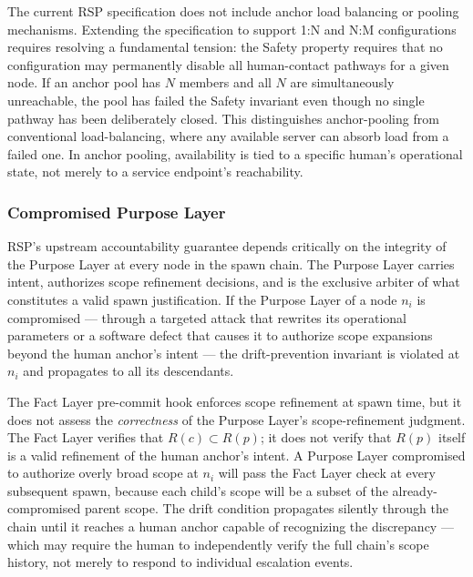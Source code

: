 The current RSP specification does not include anchor load balancing or pooling mechanisms. Extending the specification to support 1:N and N:M configurations requires resolving a fundamental tension: the Safety property requires that no configuration may permanently disable all human-contact pathways for a given node. If an anchor pool has $N$ members and all $N$ are simultaneously unreachable, the pool has failed the Safety invariant even though no single pathway has been deliberately closed. This distinguishes anchor-pooling from conventional load-balancing, where any available server can absorb load from a failed one. In anchor pooling, availability is tied to a specific human's operational state, not merely to a service endpoint's reachability.

\subsubsection{Compromised Purpose Layer}\label{sec:rs-limitations:purpose-layer}

RSP's upstream accountability guarantee depends critically on the integrity of the Purpose Layer at every node in the spawn chain. The Purpose Layer carries intent, authorizes scope refinement decisions, and is the exclusive arbiter of what constitutes a valid spawn justification. If the Purpose Layer of a node $n_i$ is compromised — through a targeted attack that rewrites its operational parameters or a software defect that causes it to authorize scope expansions beyond the human anchor's intent — the drift-prevention invariant is violated at $n_i$ and propagates to all its descendants.

The Fact Layer pre-commit hook enforces scope refinement at spawn time, but it does not assess the \emph{correctness} of the Purpose Layer's scope-refinement judgment. The Fact Layer verifies that $R(c) \subset R(p)$; it does not verify that $R(p)$ itself is a valid refinement of the human anchor's intent. A Purpose Layer compromised to authorize overly broad scope at $n_i$ will pass the Fact Layer check at every subsequent spawn, because each child's scope will be a subset of the already-compromised parent scope. The drift condition propagates silently through the chain until it reaches a human anchor capable of recognizing the discrepancy — which may require the human to independently verify the full chain's scope history, not merely to respond to individual escalation events.

